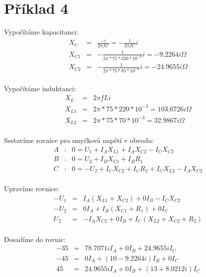 \section{Příklad 4}

Vypočítáme kapacitanci:
    \begin{eqnarray*}
        X_{C} &= & \frac{-i}{2\pi fC} = - \frac{1}{2 \pi fC}i\\
        X_{C1} &= & - \frac{1}{2 \pi * 75 * 230 * 10^{-6}}i = -9.2264i \Omega\\
        X_{C2} &= & - \frac{1}{2 \pi * 75 * 85 * 10^{-6}}i = -24.9655i \Omega\\
	\end{eqnarray*}

Vypočítáme induktanci:
    \begin{eqnarray*}
        X_{L} &= & 2 \pi fLi\\
        X_{L1} &= & 2 \pi * 75 * 220 * 10^{-3} = 103.6726i \Omega\\
        X_{L2} &= & 2 \pi * 75 * 70 * 10^{-3} = 32.9867i \Omega\\
	\end{eqnarray*}

Sestavíme rovnice pro smyčková napětí v obvodu:
    \begin{eqnarray*}
        A &: & 0 = U_{1} + I_{A}X_{L1} + I_{A}X_{C2} - I_{C}X_{C2}\\
        B &: & 0 = U_{2} + I_{B}X_{C1} + I_{B}R_{1}\\
        C &: & 0 = -U_{2} + I_{C}X_{C2} + I_{C}R_{2} + I_{C}X_{L2} - I_{A}X_{C2}\\
	\end{eqnarray*}

Upravíme rovnice:
    \begin{eqnarray*}
        - U_{1} &= & I_{A}(X_{L1} + X_{C2}) + 0I_{B} - I_{C}X_{C2}\\
        - U_{2} &= & 0I_{A} + I_{B}(X_{C1} + R_{1}) + 0I_{C}\\
        U_{2} &= & -I_{A}X_{C2} + 0I_{B} + I_{C}(X_{L2} + X_{C2} + R_{2})\\
	\end{eqnarray*}
	
Dosadíme do rovnic:
    \begin{eqnarray*}
        -35 &= & 78.7071iI_{A} + 0I_{B} + 24.9655iI_{C}\\
        -45 &= & 0I_{A} + (10 - 9.2264i)I_{B} + 0I_{C}\\
        45 &= & 24.9655iI_{A} + 0I_{B} + (13 + 8.0212i)I_{C}\\
	\end{eqnarray*}


